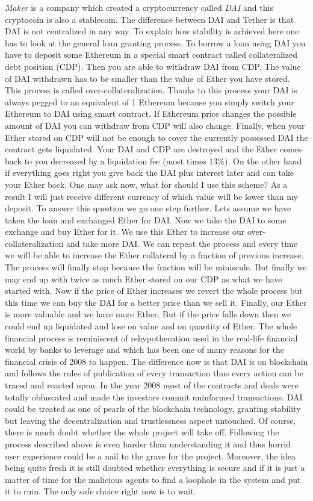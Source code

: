 \documentclass[a4paper,12pt,twoside,openany]{report}
\begin{document}
\textit{Maker} is a company which created a cryptocurrency called \textit{DAI} \cite{makerdao} and this cryptocoin is also a stablecoin. The difference between DAI and Tether is that DAI is not centralized in any way. To explain how stability is achieved here one has to look at the general loan granting process. To borrow a loan using DAI you have to deposit some Ethereum in a special smart contract called collateralized debt position (CDP). Then you are able to withdraw DAI from CDP. The value of DAI withdrawn has to be smaller than the value of Ether you have stored. This process is called over-collateralization. Thanks to this process your DAI is always pegged to an equivalent of 1 Ethereum because you simply switch your Ethereum to DAI using smart contract. If Ethereum price changes the possible amount of DAI you can withdraw from CDP will also change. Finally, when your Ether stored on CDP will not be enough to cover the currently possessed DAI the contract gets liquidated. Your DAI and CDP are destroyed and the Ether comes back to you decreased by a liquidation fee (most times 13\%). On the other hand if everything goes right you give back the DAI plus interest later and can take your Ether back. One may ask now, what for should I use this scheme? As a result I will just receive different currency of which value will be lower than my deposit. To answer this question we go one step further. Lets assume we have taken the loan and exchanged Ether for DAI. Now we take the DAI to some exchange and buy Ether for it. We use this Ether to increase our over-collateralization and take more DAI. We can repeat the process and every time we will be able to increase the Ether collateral by a fraction of previous increase. The process will finally stop because the fraction will be miniscule. But finally we may end up with twice as much Ether stored on our CDP as what we have started with. Now if the price of Ether increases we revert the whole process but this time we can buy the DAI for a better price than we sell it. Finally, our Ether is more valuable and we have more Ether. But if the price falls down then we could end up liquidated and lose on value and on quantity of Ether. The whole financial process is reminiscent of rehypothecation used in the real-life financial world by banks to leverage and which has been one of many reasons for the financial crisis of 2008 to happen. The difference now is that DAI is on blockchain and follows the rules of publication of every transaction thus every action can be traced and reacted upon. In the year 2008 most of the contracts and deals were totally obfuscated and made the investors commit uninformed transactions. DAI could be treated as one of pearls of the blockchain technology, granting stability but leaving the decentralization and trustlessness aspect untouched. Of course, there is much doubt whether the whole project will take off. Following the process described above is even harder than understanding it and thus horrid user experience could be a nail to the grave for the project. Moreover, the idea being quite fresh it is still doubted whether everything is secure and if it is just a matter of time for the malicious agents to find a loophole in the system and put it to ruin. The only safe choice right now is to wait.
\end{document}
